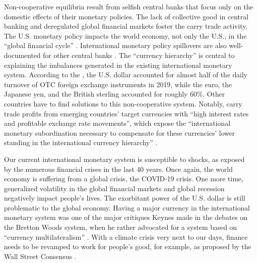 \documentclass[a4paper, twoside]{templates/ociamthesis}
\begin{document}
Non-cooperative equilibria result from selfish central banks that focus only on the domestic effects of their monetary policies. The lack of collective good in central banking and deregulated global financial markets foster the carry trade activity. The U.S. monetary policy impacts the world economy, not only the U.S., in the ``global financial cycle'' \autocite{miranda-agrippino2020}. International monetary policy spillovers are also well-documented for other central banks \autocites[e.g.,][ for the European Central Bank]{fratzscher2016}[ for the Bank of England]{schmidt2018}. The ``currency hierarchy'' \autocite{cohen1998,depaula2017} is central to explaining the imbalances generated in the existing international monetary system. According to the \textcite{bankforinternationalsettlements2019}, the U.S. dollar accounted for almost half of the daily turnover of OTC foreign exchange instruments in 2019, while the euro, the Japanese yen, and the British sterling accounted for roughly 60\%. Other countries have to find solutions to this non-cooperative system. Notably, carry trade profits from emerging countries' target currencies with ``high interest rates and profitable exchange rate movements'', which expose the ``international monetary subordination necessary to compensate for these currencies' lower standing in the international currency hierarchy'' \autocite[ 183]{bonizzi2020}.

Our current international monetary system is susceptible to shocks, as exposed by the numerous financial crises in the last 40 years. Once again, the world economy is suffering from a global crisis, the COVID-19 crisis. One more time, generalized volatility in the global financial markets and global recession negatively impact people's lives. The exorbitant power of the U.S. dollar is still problematic to the global economy. Having a major currency in the international monetary system was one of the major critiques Keynes made in the debates on the Bretton Woods system, when he rather advocated for a system based on ``currency multilateralism'' \autocite[ 25]{keynes1978b}. With a climate crisis very next to our days, finance needs to be revamped to work for people's good, for example, as proposed by the Wall Street Consensus \autocite{gabor2021}.
\end{document}
